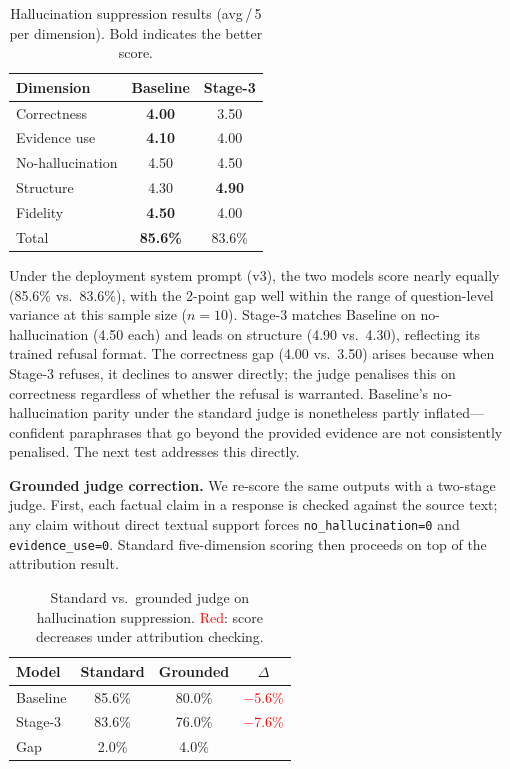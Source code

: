 \documentclass[10pt,conference]{IEEEtran}
\begin{document}
\begin{table}[htbp]
\centering
\caption{Hallucination suppression results (avg\,/\,5 per dimension).
Bold indicates the better score.}
\label{tab:hall}
\small
\begin{tabular}{@{}lcc@{}}
\toprule
Dimension & Baseline & Stage-3 \\
\midrule
Correctness       & \textbf{4.00} & 3.50 \\
Evidence use      & \textbf{4.10} & 4.00 \\
No-hallucination  & 4.50 & 4.50 \\
Structure         & 4.30 & \textbf{4.90} \\
Fidelity          & \textbf{4.50} & 4.00 \\
\midrule
Total             & \textbf{85.6\%} & 83.6\% \\
\bottomrule
\end{tabular}
\end{table}

Under the deployment system prompt (v3), the two models score nearly equally
(85.6\% vs.\ 83.6\%), with the 2-point gap well within the range of
question-level variance at this sample size ($n{=}10$).
Stage-3 matches Baseline on no-hallucination (4.50 each) and leads on
structure (4.90 vs.\ 4.30), reflecting its trained refusal format.
The correctness gap (4.00 vs.\ 3.50) arises because when Stage-3 refuses,
it declines to answer directly; the judge penalises this on correctness
regardless of whether the refusal is warranted.
Baseline's no-hallucination parity under the standard judge is nonetheless
partly inflated---confident paraphrases that go beyond the provided evidence
are not consistently penalised.
The next test addresses this directly.

\noindent\textbf{Grounded judge correction.}
We re-score the same outputs with a two-stage judge.
First, each factual claim in a response is checked against the source text;
any claim without direct textual support forces \texttt{no\_hallucination=0}
and \texttt{evidence\_use=0}.
Standard five-dimension scoring then proceeds on top of the attribution result.

\begin{table}[htbp]
\centering
\caption{Standard vs.\ grounded judge on hallucination suppression.
\textcolor{red}{Red}: score decreases under attribution checking.}
\label{tab:grounded}
\small
\begin{tabular}{@{}lccc@{}}
\toprule
Model & Standard & Grounded & $\Delta$ \\
\midrule
Baseline & 85.6\% & 80.0\% & \textcolor{red}{$-$5.6\%} \\
Stage-3  & 83.6\% & 76.0\% & \textcolor{red}{$-$7.6\%} \\
\midrule
Gap & 2.0\% & 4.0\% & \\
\bottomrule
\end{tabular}
\end{table}
\end{document}
